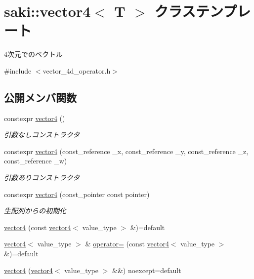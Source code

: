 \hypertarget{classsaki_1_1vector4}{}\section{saki\+:\+:vector4$<$ T $>$ クラステンプレート}
\label{classsaki_1_1vector4}


4次元でのベクトル  




{\ttfamily \#include $<$vector\+\_\+4d\+\_\+operator.\+h$>$}

\subsection*{公開メンバ関数}
\begin{DoxyCompactItemize}
\item 
constexpr \mbox{\hyperlink{classsaki_1_1vector4_a79dd4b2f31976d739dd7c6a3a799cd5b}{vector4}} ()
\begin{DoxyCompactList}\small\item\em 引数なしコンストラクタ \end{DoxyCompactList}\item 
constexpr \mbox{\hyperlink{classsaki_1_1vector4_a49fe2f8b17fc93ffb433fcceec620ae0}{vector4}} (const\+\_\+reference \+\_\+x, const\+\_\+reference \+\_\+y, const\+\_\+reference \+\_\+z, const\+\_\+reference \+\_\+w)
\begin{DoxyCompactList}\small\item\em 引数ありコンストラクタ \end{DoxyCompactList}\item 
constexpr \mbox{\hyperlink{classsaki_1_1vector4_aa69cd330294e32dc53466b100532aa13}{vector4}} (const\+\_\+pointer const pointer)
\begin{DoxyCompactList}\small\item\em 生配列からの初期化 \end{DoxyCompactList}\item 
\mbox{\hyperlink{classsaki_1_1vector4_a48d6b2d19c4bdf4a909d5017e7fb9aaa}{vector4}} (const \mbox{\hyperlink{classsaki_1_1vector4}{vector4}}$<$ value\+\_\+type $>$ \&)=default
\item 
\mbox{\hyperlink{classsaki_1_1vector4}{vector4}}$<$ value\+\_\+type $>$ \& \mbox{\hyperlink{classsaki_1_1vector4_a0fba7bd5e55de03aca8c11a952e7217f}{operator=}} (const \mbox{\hyperlink{classsaki_1_1vector4}{vector4}}$<$ value\+\_\+type $>$ \&)=default
\item 
\mbox{\hyperlink{classsaki_1_1vector4_ab122c461e9e6e775f981d6c197c43fe1}{vector4}} (\mbox{\hyperlink{classsaki_1_1vector4}{vector4}}$<$ value\+\_\+type $>$ \&\&) noexcept=default

\end{DoxyCompactItemize}
